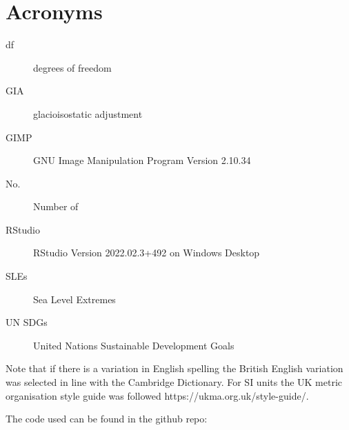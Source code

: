
\chapter{Acronyms}
\begin{description}
\item[df]degrees of freedom
\item[GIA] glacioisostatic adjustment
\item[GIMP] GNU Image Manipulation Program Version 2.10.34
\item[No.] Number of
\item [RStudio] RStudio Version 2022.02.3+492 on Windows Desktop
\item[SLEs] Sea Level Extremes
\item [UN SDGs] United Nations Sustainable Development Goals 
\end{description}

Note that if there is a variation in English spelling the British English variation was selected in line with the Cambridge Dictionary. For SI units the UK metric organisation style guide was followed https://ukma.org.uk/style-guide/.  

The code used can be found in the github repo: 